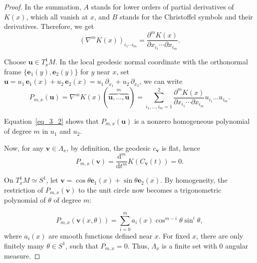 \documentclass[10pt,a4paper]{amsart}
\begin{document}
\begin{proof}
	In the summation, $A$ stands for lower orders of partial derivatives of $K(x)$, which all vanish at $x$, and $B$ stands for the Christoffel symbols and their derivatives. Therefore, we get
	\begin{equation}\label{eq_3_1}
		{(\nabla^{m} K(x))}_{i_1\cdots i_m}=\dfrac{\partial^m K(x)}{\partial x_{i_1}\cdots\partial x_{i_m}}.
	\end{equation}

	Choose $\bm{u}\in T^{1}_x M$. In the local geodesic normal coordinate with the orthonormal frame $\{\bm{e}_{1}(y),\bm{e}_{2}(y)\}$ for $y$ near $x$, set $\bm{u}=u_{1}\,\bm{e}_{1}(x)+u_{2}\,\bm{e}_{2}(x)=u_{1}\,\partial_{x_1}+u_{2}\,\partial_{x_2}$, we can write
	\begin{equation}\label{eq_3_2}
		P_{m,x}(\bm{u})=\nabla^{m} K(x)(\overbrace{\bm{u},\ldots,\bm{u}}^{m})=\sum_{i_{1},\ldots,i_{m}=1}^{2}\dfrac{\partial^{m}K(x)}{\partial x_{i_1}\cdots\partial x_{i_m}}u_{i_1}\ldots u_{i_m}.
	\end{equation}

	Equation~\ref{eq_3_2} shows that $P_{m,x}(\bm{u})$ is a nonzero homogeneous polynomial of degree $m$ in $u_1$ and $u_2$.

	Now, for any $\bm{v}\in \Lambda_x$, by definition, the geodesic $c_{\bm{v}}$ is flat, hence
	\begin{displaymath}
		P_{m,x}(\bm{v})=\dfrac{\mathrm{d}^{m}}{\mathrm{d}t^{m}}K(C_{\bm{v}}(t))=0.
	\end{displaymath}

	On $T^1_x M\simeq S^1$, let $\bm{v}=\cos\theta\bm{e}_1(x)+\sin\theta\bm{e}_2(x)$. By homogeneity, the restriction of $P_{m,x}(\bm{v})$ to the unit circle now becomes a trigonometric polynomial of $\theta$ of degree $m$:

	\begin{equation}\label{eq_3_3}
		P_{m,x}(\bm{v}(x,\theta))=\sum_{i=0}^{m} a_{i}(x)\cos^{m-i}\theta\sin^{i}\theta,
	\end{equation}
	where $a_i(x)$ are smooth functions defined near $x$. For fixed $x$, there are only finitely many $\theta\in S^{1}$, such that $P_{m,x}=0$. Thus, $\Lambda_x$ is a finite set with $0$ angular measure.
\end{proof}
\end{document}
